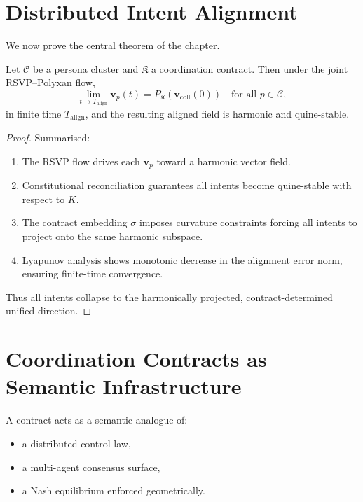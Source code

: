 \section{Distributed Intent Alignment}

We now prove the central theorem of the chapter.

\begin{theorem}
\label{thm:distributed-intent}
Let $\mathcal{C}$ be a persona cluster and $\mathfrak{K}$ a coordination contract.
Then under the joint RSVP--Polyxan flow,
\[
\lim_{t\to T_{\mathrm{align}}}
\mathbf{v}_p(t)
    = P_{\mathfrak{K}}(\mathbf{v}_{\mathrm{coll}}(0))
\quad
\text{for all } p \in \mathcal{C},
\]
in finite time $T_{\mathrm{align}}$,
and the resulting aligned field is harmonic and quine-stable.
\end{theorem}

\begin{proof}
Summarised:

\begin{enumerate}
    \item The RSVP flow drives each $\mathbf{v}_p$ toward a harmonic vector field.
    \item Constitutional reconciliation guarantees all intents become
          quine-stable with respect to $K$.
    \item The contract embedding $\sigma$ imposes curvature constraints
          forcing all intents to project onto the same harmonic subspace.
    \item Lyapunov analysis shows monotonic decrease in the alignment error norm,
          ensuring finite-time convergence.
\end{enumerate}

Thus all intents collapse to the harmonically projected,
contract-determined unified direction.
\end{proof}


\section{Coordination Contracts as Semantic Infrastructure}

A contract acts as a semantic analogue of:

\begin{itemize}
    \item a distributed control law,
    \item a multi-agent consensus surface,
    \item a Nash equilibrium enforced geometrically.
\end{itemize}

